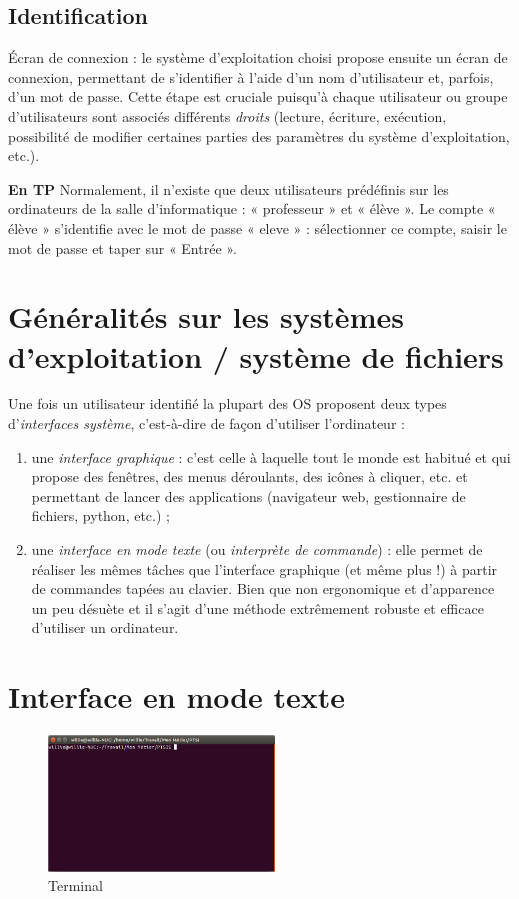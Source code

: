  \subsection{Identification} 
 
 Écran de connexion : le système d'exploitation choisi propose ensuite un écran de connexion, permettant de s'identifier à l'aide d'un nom d'utilisateur et, parfois, d'un mot de passe. Cette étape est cruciale puisqu'à chaque utilisateur ou groupe d'utilisateurs sont associés différents \textit{droits} (lecture, écriture, exécution, possibilité de modifier certaines parties des paramètres du système d'exploitation, etc.). 
 
 \textbf{En TP} Normalement, il n'existe que deux utilisateurs prédéfinis sur les ordinateurs de la salle d'informatique : « professeur » et « élève ». Le compte « élève » s'identifie avec le mot de passe « eleve » : sélectionner ce compte, saisir le mot de passe et taper sur « Entrée ».


\section{Généralités sur les systèmes d'exploitation / système de fichiers}

Une fois un utilisateur identifié la plupart des OS proposent deux types d'\textit{interfaces système}, c'est-à-dire de façon d'utiliser l'ordinateur :
\begin{enumerate}
 \item une \textit{interface graphique} : c'est celle à laquelle tout le monde est habitué et qui propose des fenêtres, des menus déroulants, des icônes à cliquer, etc. et permettant de lancer des applications (navigateur web, gestionnaire de fichiers, python, etc.) ;
 \item une \textit{interface en mode texte} (ou \textit{interprète de commande}) : elle permet de réaliser les mêmes tâches que l'interface graphique (et même plus !) à partir de commandes tapées au clavier. Bien que non ergonomique et d'apparence un peu désuète et  il s'agit d'une méthode extrêmement robuste et efficace d'utiliser un ordinateur.
\end{enumerate}

\newpage
\section{Interface en mode texte}

\begin{figure}[htp]
 \centering
 \includegraphics[width=6cm]{img/terminal}
 \caption{Terminal}
 \label{fig:terminal}
\end{figure}

